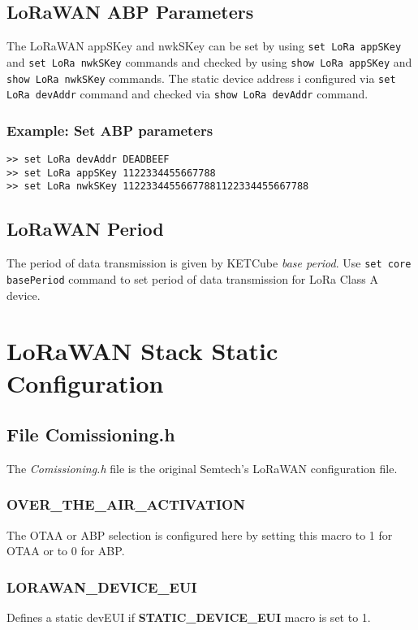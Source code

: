 \subsection{LoRaWAN ABP Parameters}
The LoRaWAN appSKey and nwkSKey can be set by using {\tt set LoRa appSKey} and {\tt set LoRa nwkSKey} commands and checked by using {\tt show LoRa appSKey} and {\tt show LoRa nwkSKey} commands. The static device address i configured via  {\tt set LoRa devAddr} command and checked via  {\tt show LoRa devAddr} command.
  
\subsubsection*{Example: Set ABP parameters}
\begin{Verbatim}[frame=single, fontsize=\small]
>> set LoRa devAddr DEADBEEF
>> set LoRa appSKey 1122334455667788
>> set LoRa nwkSKey 11223344556677881122334455667788
\end{Verbatim}

\subsection{LoRaWAN Period}
The period of data transmission is given by KETCube {\it base period}. Use {\tt set core basePeriod} command to set period of data transmission for LoRa Class A device.
  
\clearpage
\section{LoRaWAN Stack Static Configuration}

\subsection{File Comissioning.h}
The {\it Comissioning.h} file is the original Semtech's LoRaWAN configuration file. 

\subsubsection{OVER\_THE\_AIR\_ACTIVATION}
The OTAA or ABP selection is configured here by setting this macro to 1 for OTAA or to 0 for ABP.

\subsubsection{LORAWAN\_DEVICE\_EUI} 
Defines a static devEUI if {\bf STATIC\_DEVICE\_EUI} macro is set to 1.

